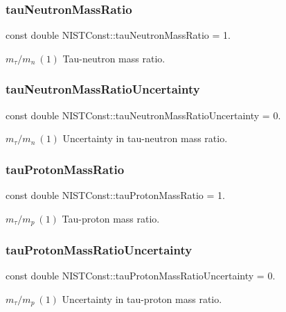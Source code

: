 \subsubsection{\texorpdfstring{tau\+Neutron\+Mass\+Ratio}{tauNeutronMassRatio}}
{\footnotesize\ttfamily const double N\+I\+S\+T\+Const\+::tau\+Neutron\+Mass\+Ratio = 1.}

$m_\tau/m_n \ (1)$ Tau-\/neutron mass ratio. \mbox{\label{group___tau_ga65d53ed3744dc7b5926ea16b9c62e185}} 
\subsubsection{\texorpdfstring{tau\+Neutron\+Mass\+Ratio\+Uncertainty}{tauNeutronMassRatioUncertainty}}
{\footnotesize\ttfamily const double N\+I\+S\+T\+Const\+::tau\+Neutron\+Mass\+Ratio\+Uncertainty = 0.}

$m_\tau/m_n \ (1)$ Uncertainty in tau-\/neutron mass ratio. \mbox{\label{group___tau_ga07236b2b11bdbfaee49e581a44bb01e8}} 
\subsubsection{\texorpdfstring{tau\+Proton\+Mass\+Ratio}{tauProtonMassRatio}}
{\footnotesize\ttfamily const double N\+I\+S\+T\+Const\+::tau\+Proton\+Mass\+Ratio = 1.}

$m_\tau/m_p \ (1)$ Tau-\/proton mass ratio. \mbox{\label{group___tau_ga8c32666623ba327b9d6d8d376fdbad3c}} 
\subsubsection{\texorpdfstring{tau\+Proton\+Mass\+Ratio\+Uncertainty}{tauProtonMassRatioUncertainty}}
{\footnotesize\ttfamily const double N\+I\+S\+T\+Const\+::tau\+Proton\+Mass\+Ratio\+Uncertainty = 0.}

$m_\tau/m_p \ (1)$ Uncertainty in tau-\/proton mass ratio. 